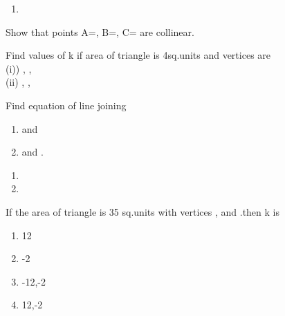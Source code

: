 \solution 
\begin{enumerate}
    \item 
    
    

\end{enumerate}
\item Show that points A=, B=, C= are collinear.
\\
\solution 

\item Find values of k if area of triangle is 4sq.units and vertices are \\
(i)) , ,  \\ (ii) , , 
\item Find equation of line joining
\begin{enumerate}
\item  {} and  
\item {} and .
\end{enumerate}
\solution
\begin{enumerate}
    \item 
    \item 
    
\end{enumerate}

\item If the area of triangle is 35 sq.units with vertices ,  and .then k is 
\begin{enumerate}
\item 12
\item -2
\item -12,-2
\item 12,-2
\end{enumerate}
\solution


